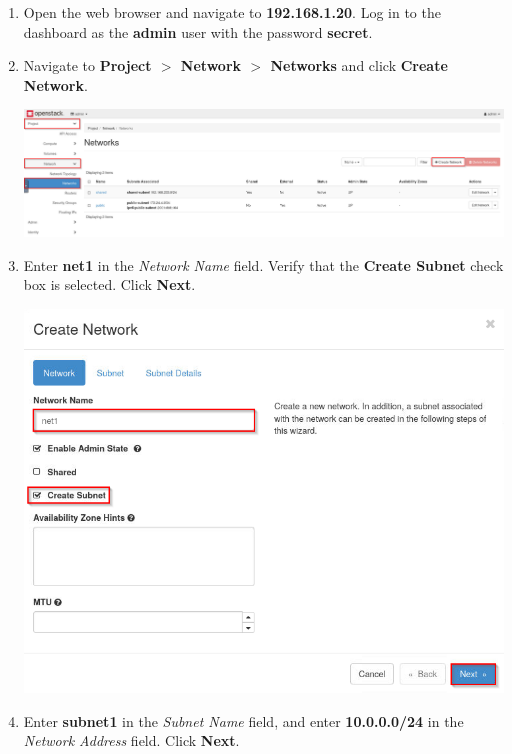\documentclass[letterpaper, 12pt]{article}
\begin{document}
\begin{enumerate}
    \item Open the web browser and navigate to \textbf{192.168.1.20}. Log in to the dashboard as the \textbf{admin} user
    with the password \textbf{secret}.

    \item Navigate to \textbf{Project $>$ Network $>$ Networks} and click \textbf{Create Network}.

    \begin{center}
        \includegraphics[width=\linewidth]{images/part3/step2.png}
    \end{center}

    \item Enter \textbf{net1} in the \textit{Network Name} field. Verify that the \textbf{Create Subnet} check box is
    selected. Click \textbf{Next}.

    \begin{center}
        \includegraphics[width=\linewidth]{images/part3/step3.png}
    \end{center}

    \item Enter \textbf{subnet1} in the \textit{Subnet Name} field, and enter \textbf{10.0.0.0/24} in the
    \textit{Network Address} field. Click \textbf{Next}.


\end{enumerate}
\end{document}
